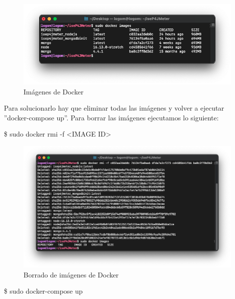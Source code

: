 \begin{figure}[H]
    \centering  
    \includegraphics[scale=0.5]{images/docker_images.png}
    \caption{Imágenes de Docker}
    \label{fig:docker_images}
\end{figure}

Para solucionarlo hay que eliminar todas las imágenes y volver a ejecutar ''docker-compose up''. Para borrar las imágenes ejecutamos lo siguiente:
\begin{tcolorbox}[colback=black!10, halign=left]
    \$ sudo docker rmi -f <IMAGE ID>
\end{tcolorbox}

\begin{figure}[H]
    \centering  
    \includegraphics[scale=0.5]{images/docker_rm.png}
    \caption{Borrado de imágenes de Docker}
    \label{fig:docker_rm}
\end{figure}

\begin{tcolorbox}[colback=black!10, halign=left]
    \$ sudo docker-compose up
\end{tcolorbox}

